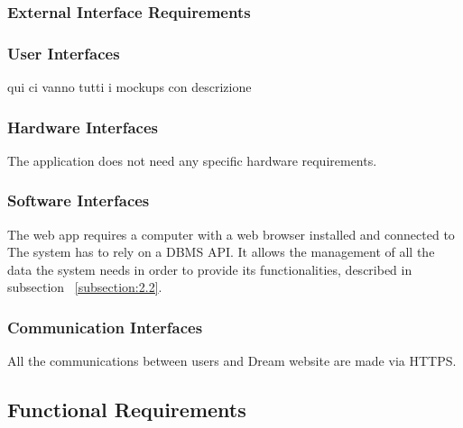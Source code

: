 \subsubsection{External Interface Requirements}

\subsubsection{User Interfaces}
qui ci vanno tutti i mockups con descrizione

\subsubsection{Hardware Interfaces}
The application does not need any specific hardware requirements. 

\subsubsection{Software Interfaces}
The web app requires a computer with a web browser installed and connected to 
The system has to rely on a DBMS API. It allows the management of all the data the system 
needs in order to provide its functionalities, described in subsection ~\ref{subsection:2.2}.

\subsubsection{Communication Interfaces}
All the communications between users and Dream website are made via HTTPS.

\newpage

\subsection{Functional Requirements}
